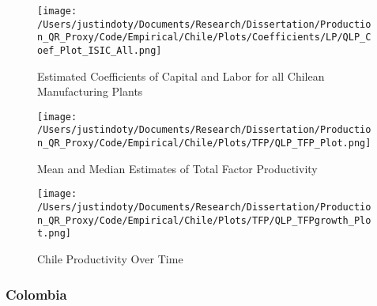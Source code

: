 \documentclass[11pt]{article}
\begin{document}
\begin{figure}[H]
\centering
\caption{Estimated Coefficients of Capital and Labor for all Chilean Manufacturing Plants}
\texttt{[image: /Users/justindoty/Documents/Research/Dissertation/Production\_QR\_Proxy/Code/Empirical/Chile/Plots/Coefficients/LP/QLP\_Coef\_Plot\_ISIC\_All.png]}
\label{fig:LPCHLall}
\end{figure}

\begin{figure}[H]
\centering
\caption{Mean and Median Estimates of Total Factor Productivity}
\texttt{[image: /Users/justindoty/Documents/Research/Dissertation/Production\_QR\_Proxy/Code/Empirical/Chile/Plots/TFP/QLP\_TFP\_Plot.png]}
\label{fig:LPTFPDens}
\end{figure}

\begin{figure}[H]
\centering
\caption{Chile Productivity Over Time}
\texttt{[image: /Users/justindoty/Documents/Research/Dissertation/Production\_QR\_Proxy/Code/Empirical/Chile/Plots/TFP/QLP\_TFPgrowth\_Plot.png]}
\label{fig:LPCHLpgrowth}
\end{figure}

\subsubsection{Colombia}
\end{document}
